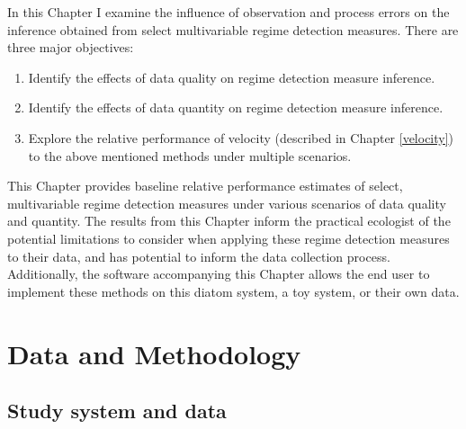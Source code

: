 \documentclass[12pt,twoside,openany]{reedthesis}
\providecommand{\tightlist}{%
  \setlength{\itemsep}{0pt}\setlength{\parskip}{0pt}}
\begin{document}
In this Chapter I examine the influence of observation and process errors on the inference obtained from select multivariable regime detection measures. There are three major objectives:
\begin{enumerate}
\def\labelenumi{\arabic{enumi}.}
\tightlist
\item
  Identify the effects of data quality on regime detection measure inference.\\
\item
  Identify the effects of data quantity on regime detection measure inference.\\
\item
  Explore the relative performance of velocity (described in Chapter \ref{velocity}) to the above mentioned methods under multiple scenarios.
\end{enumerate}
This Chapter provides baseline relative performance estimates of select, multivariable regime detection measures under various scenarios of data quality and quantity. The results from this Chapter inform the practical ecologist of the potential limitations to consider when applying these regime detection measures to their data, and has potential to inform the data collection process. Additionally, the software accompanying this Chapter allows the end user to implement these methods on this diatom system, a toy system, or their own data.

\hypertarget{data-and-methodology}{%
\section{Data and Methodology}\label{data-and-methodology}}

\hypertarget{study-system-and-data}{%
\subsection{Study system and data}\label{study-system-and-data}}
\end{document}
